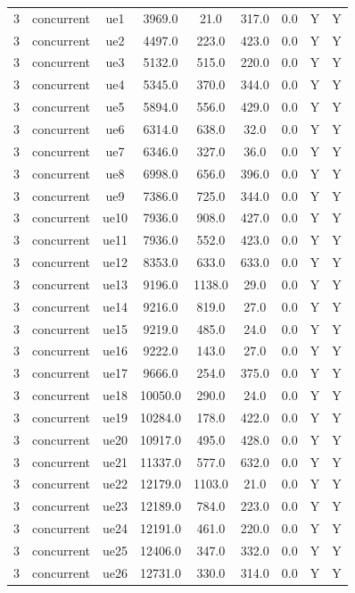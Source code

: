 \begin{table}[ht]
\begin{tabular}{|c|c|c|c|c|c|c|c|c|}
\hline
3 & concurrent & ue1 & 3969.0 & 21.0 & 317.0 & 0.0 & Y & Y \\
3 & concurrent & ue2 & 4497.0 & 223.0 & 423.0 & 0.0 & Y & Y \\
3 & concurrent & ue3 & 5132.0 & 515.0 & 220.0 & 0.0 & Y & Y \\
3 & concurrent & ue4 & 5345.0 & 370.0 & 344.0 & 0.0 & Y & Y \\
3 & concurrent & ue5 & 5894.0 & 556.0 & 429.0 & 0.0 & Y & Y \\
3 & concurrent & ue6 & 6314.0 & 638.0 & 32.0 & 0.0 & Y & Y \\
3 & concurrent & ue7 & 6346.0 & 327.0 & 36.0 & 0.0 & Y & Y \\
3 & concurrent & ue8 & 6998.0 & 656.0 & 396.0 & 0.0 & Y & Y \\
3 & concurrent & ue9 & 7386.0 & 725.0 & 344.0 & 0.0 & Y & Y \\
3 & concurrent & ue10 & 7936.0 & 908.0 & 427.0 & 0.0 & Y & Y \\
3 & concurrent & ue11 & 7936.0 & 552.0 & 423.0 & 0.0 & Y & Y \\
3 & concurrent & ue12 & 8353.0 & 633.0 & 633.0 & 0.0 & Y & Y \\
3 & concurrent & ue13 & 9196.0 & 1138.0 & 29.0 & 0.0 & Y & Y \\
3 & concurrent & ue14 & 9216.0 & 819.0 & 27.0 & 0.0 & Y & Y \\
3 & concurrent & ue15 & 9219.0 & 485.0 & 24.0 & 0.0 & Y & Y \\
3 & concurrent & ue16 & 9222.0 & 143.0 & 27.0 & 0.0 & Y & Y \\
3 & concurrent & ue17 & 9666.0 & 254.0 & 375.0 & 0.0 & Y & Y \\
3 & concurrent & ue18 & 10050.0 & 290.0 & 24.0 & 0.0 & Y & Y \\
3 & concurrent & ue19 & 10284.0 & 178.0 & 422.0 & 0.0 & Y & Y \\
3 & concurrent & ue20 & 10917.0 & 495.0 & 428.0 & 0.0 & Y & Y \\
3 & concurrent & ue21 & 11337.0 & 577.0 & 632.0 & 0.0 & Y & Y \\
3 & concurrent & ue22 & 12179.0 & 1103.0 & 21.0 & 0.0 & Y & Y \\
3 & concurrent & ue23 & 12189.0 & 784.0 & 223.0 & 0.0 & Y & Y \\
3 & concurrent & ue24 & 12191.0 & 461.0 & 220.0 & 0.0 & Y & Y \\
3 & concurrent & ue25 & 12406.0 & 347.0 & 332.0 & 0.0 & Y & Y \\
3 & concurrent & ue26 & 12731.0 & 330.0 & 314.0 & 0.0 & Y & Y \\

\end{tabular}
\end{table}
